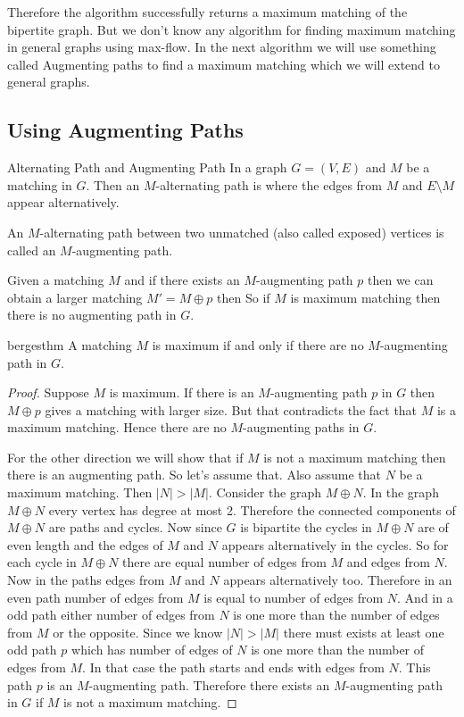 Therefore the algorithm successfully returns a maximum matching of the bipertite graph. But we don't know any algorithm for finding maximum matching in general graphs using max-flow. In the next algorithm we will use something called Augmenting paths to find a maximum matching which we will extend to general graphs.
\subsection{Using Augmenting Paths}\label{section:bp-augment-path}
\begin{Definition}{Alternating Path and Augmenting Path}{}
	In a graph $G=(V,E)$ and $M$ be a matching in $G$. Then an $M$-alternating path is where the edges from $M$ and $E\setminus M$ appear alternatively.\parinn
	
	An $M$-alternating path between two unmatched (also called exposed) vertices is called an $M$-augmenting path. 
\end{Definition}

Given a matching $M$ and if there exists an $M$-augmenting path $p$ then we can obtain a larger matching $M'=M\oplus p$ then  So if $M$ is maximum matching then there is no augmenting path in $G$.
\begin{Theorem}{}{bergesthm}
	A matching $M$ is maximum if and only if there are no $M$-augmenting path in $G$.
\end{Theorem}
\begin{proof}
	Suppose $M$ is maximum. If there is an $M$-augmenting path $p$ in $G$ then $M\oplus p$  gives a matching with larger size. But that contradicts the fact that $M$ is a maximum matching. Hence there are no $M$-augmenting paths in $G$.
	
	For the other direction we will show that if $M$ is not a maximum matching then there is an augmenting path. So let's assume that. Also assume that $N$ be a maximum matching. Then $|N|>|M|$. Consider the graph $M\oplus N$. In the graph $M\oplus N$ every vertex has degree at most 2. Therefore the connected components of $M\oplus N$ are paths and cycles. Now since $G$ is bipartite the cycles in $M\oplus N$ are of even length and the edges of $M$ and $N$ appears alternatively in the cycles. So for each cycle in $M\oplus N$ there are equal number of edges from $M$ and edges from $N$. Now in the paths edges from $M$ and $N$ appears alternatively  too. Therefore in an even path number of edges from $M$ is equal to number of edges from $N$. And in a odd path either number of edges from $N$ is one more than the number of edges from $M$ or the opposite. Since we know $|N|>|M|$ there must exists at least one odd path $p$ which has number of edges of $N$ is one more than the number of edges from $M$. In that case the path starts and ends with edges from $N$. This path $p$ is an $M$-augmenting path. Therefore there exists an $M$-augmenting path in $G$ if $M$ is not a maximum matching. 
\end{proof}


